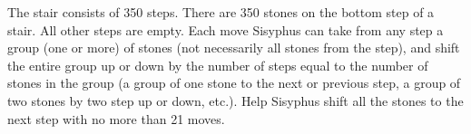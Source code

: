 \problem
The stair consists of 350 steps.
There are 350 stones on the bottom step of a stair.
All other steps are empty.
Each move Sisyphus can take from any step a group (one or more) of stones
(not necessarily all stones from the step), and shift the entire group up or
down by the number of steps equal to the number of stones in the group
(a group of one stone to the next or previous step, a group of two stones by
two step up or down, etc.).
Help Sisyphus shift all the stones to the next step with no more than
21 moves.

\solution

\endproblem
